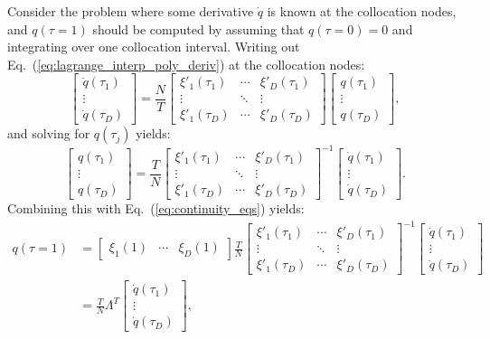 \documentclass[a4paper,12pt]{article}
\newcommand{\myl}{\xi}
\newcommand{\myldot}{\myl'}
\newcommand{\matr}[2]{\left[\begin{array}{#1}#2\end{array}\right]}
\newcommand{\refeq}[1]{Eq.~(\ref{#1})}
\begin{document}
Consider the problem where some derivative $\dot{q}$ is known at the collocation nodes, and $q(\tau=1)$ should be computed by assuming that $q(\tau=0)=0$ and integrating over one collocation interval.
Writing out \refeq{eq:lagrange_interp_poly_deriv} at the collocation nodes:
\begin{equation}
\matr{c}{
\dot{q}(\tau_1) \\
\vdots   \\
\dot{q}(\tau_D)}
=
\frac{N}{T}
\matr{ccc}{
\myldot_1(\tau_1) & \cdots & \myldot_D(\tau_1) \\
\vdots &  \ddots & \vdots \\
\myldot_1(\tau_D) & \cdots & \myldot_D(\tau_D)}
%
\matr{c}{
q(\tau_1) \\
\vdots   \\
q(\tau_D)},
\end{equation}
and solving for $q(\tau_j)$ yields:
\begin{equation}
\matr{c}{
q(\tau_1) \\
\vdots   \\
q(\tau_D)}
%
=
%
\frac{T}{N}
\matr{ccc}{
\myldot_1(\tau_1) & \cdots & \myldot_D(\tau_1) \\
\vdots           & \ddots & \vdots \\
\myldot_1(\tau_D) & \cdots & \myldot_D(\tau_D)}^{-1}
%
\matr{c}{
\dot{q}(\tau_1) \\
\vdots   \\
\dot{q}(\tau_D)}.
\end{equation}
Combining this with \refeq{eq:continuity_eqs} yields:
\begin{equation}
\begin{aligned}
q(\tau=1) &=
\matr{ccc}{\myl_1(1) & \cdots & \myl_D(1)}
\frac{T}{N}
\matr{ccc}{
\myldot_1(\tau_1) & \cdots & \myldot_D(\tau_1) \\
\vdots           & \ddots & \vdots \\
\myldot_1(\tau_D) & \cdots & \myldot_D(\tau_D)}^{-1}
%
\matr{c}{
\dot{q}(\tau_1) \\
\vdots   \\
\dot{q}(\tau_D)} \\
&=
\frac{T}{N}\Lambda^T
\matr{c}{
\dot{q}(\tau_1) \\
\vdots   \\
\dot{q}(\tau_D)},
\end{aligned}
\end{equation}
\end{document}
